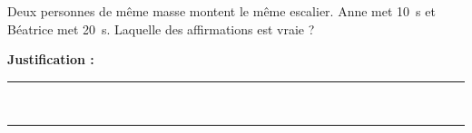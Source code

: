 Deux personnes de même masse montent le même escalier. Anne met \qty{10}{s} et Béatrice met \qty{20}{s}. Laquelle des affirmations est vraie ?

\choices

\noindent\textbf{Justification :} \hrulefill \\[2.5ex]
\rule{\linewidth}{0.4pt} \\[2.5ex]
\rule{\linewidth}{0.4pt}
\vfill
